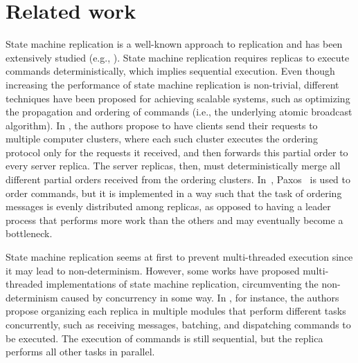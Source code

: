 \documentclass[11pt]{article}
\begin{document}
\section{Related work}
\label{sec:rwork}

State machine replication is a well-known approach to replication and has been extensively studied (e.g., \cite{Lam78, Sch90, kapritsos2012eve, kotla2004htbft, santos2013htsmr}).
State machine replication requires replicas to execute commands deterministically, which implies sequential execution.
Even though increasing the performance of state machine replication is non-trivial, different techniques have been proposed for achieving scalable systems, such as optimizing the propagation and ordering of commands (i.e., the underlying atomic broadcast algorithm).
In \cite{kapritsos2010scalable}, the authors propose to have clients send their requests to multiple computer clusters, where each such cluster executes the ordering protocol only for the requests it received, and then forwards this partial order to every server replica.
The server replicas, then, must deterministically merge all different partial orders received from the ordering clusters.
In~\cite{biely2012spaxos}, Paxos~\cite{Lam98} is used to order commands, but it is implemented in a way such that the task of ordering messages is evenly distributed among replicas, as opposed to having a leader process that performs more work than the others and may eventually become a bottleneck.

State machine replication seems at first to prevent multi-threaded execution since it may lead to non-determinism.
However, some works have proposed multi-threaded implementations of state machine replication, circumventing the non-determinism caused by concurrency in some way.
In \cite{santos2013htsmr}, for instance, the authors propose organizing each replica in multiple modules that perform different tasks concurrently, such as receiving messages, batching, and dispatching commands to be executed.
The execution of commands is still sequential, but the replica performs all other tasks in parallel. 
\end{document}
